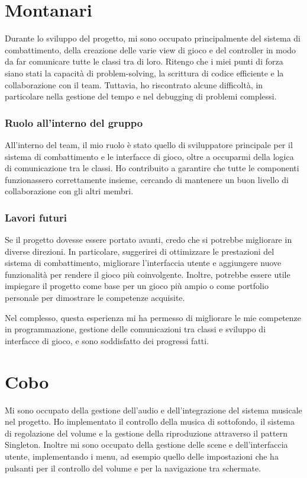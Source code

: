 \documentclass[a4paper,12pt]{report}
\begin{document}
\section{Montanari}
Durante lo sviluppo del progetto, mi sono occupato principalmente del sistema di combattimento, della creazione delle varie view di gioco e del controller in modo da far comunicare tutte le classi tra di loro. Ritengo che i miei punti di forza siano stati la capacità di problem-solving, la scrittura di codice efficiente e la collaborazione con il team. Tuttavia, ho riscontrato alcune difficoltà, in particolare nella gestione del tempo e nel debugging di problemi complessi.

\subsubsection{Ruolo all'interno del gruppo}
All'interno del team, il mio ruolo è stato quello di sviluppatore principale per il sistema di combattimento e le interfacce di gioco, oltre a occuparmi della logica di comunicazione tra le classi. Ho contribuito a garantire che tutte le componenti funzionassero correttamente insieme, cercando di mantenere un buon livello di collaborazione con gli altri membri.

\subsubsection{Lavori futuri}
Se il progetto dovesse essere portato avanti, credo che si potrebbe migliorare in diverse direzioni. In particolare, suggerirei di ottimizzare le prestazioni del sistema di combattimento, migliorare l'interfaccia utente e aggiungere nuove funzionalità per rendere il gioco più coinvolgente. Inoltre, potrebbe essere utile impiegare il progetto come base per un gioco più ampio o come portfolio personale per dimostrare le competenze acquisite.

Nel complesso, questa esperienza mi ha permesso di migliorare le mie competenze in programmazione, gestione delle comunicazioni tra classi e sviluppo di interfacce di gioco, e sono soddisfatto dei progressi fatti.

\section{Cobo}
Mi sono occupato della gestione dell’audio e dell’integrazione del sistema musicale nel progetto. Ho implementato il controllo della musica di sottofondo, il sistema di regolazione del volume e la gestione della riproduzione attraverso il pattern Singleton. Inoltre mi sono occupato della gestione delle scene e dell’interfaccia utente, implementando i menu, ad esempio quello delle impostazioni che ha pulsanti per il controllo del volume e per la navigazione tra schermate.
\end{document}
